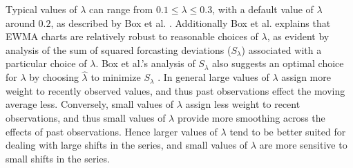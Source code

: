 \documentclass[12pt]{article}
\newcommand{\E}[1]{
        \mathbb{E}\left[~#1~\right]
}
\def \ix {
	\text{I}(\bm{x})
}
\begin{document}
%
Typical values of $\lambda$ can range from $0.1\le\lambda\le0.3$, with a default value of $\lambda$ around $0.2$, as described by Box et al. \cite{boxBook}.
Additionally Box et al. explains that EWMA charts are relatively robust to reasonable choices of $\lambda$, as evident by analysis of the sum of squared forcasting deviations ($S_\lambda$) associated with a particular choice of $\lambda$.
%
Box et al.'s analysis of $S_\lambda$ also suggests an optimal choice for $\lambda$ by choosing $\hat\lambda$ to minimize $S_\lambda$ \cite[p. 87]{boxBook}.
In general large values of $\lambda$ assign more weight to recently observed values, and thus past observations effect the moving average less. %
%
Conversely, small values of $\lambda$ assign less weight to recent observations, and thus small values of $\lambda$ provide more smoothing across the effects of past observations. 
Hence larger values of $\lambda$ tend to be better suited for dealing with large shifts in the series, and small values of $\lambda$ are more sensitive to small shifts in the series.
\end{document}
